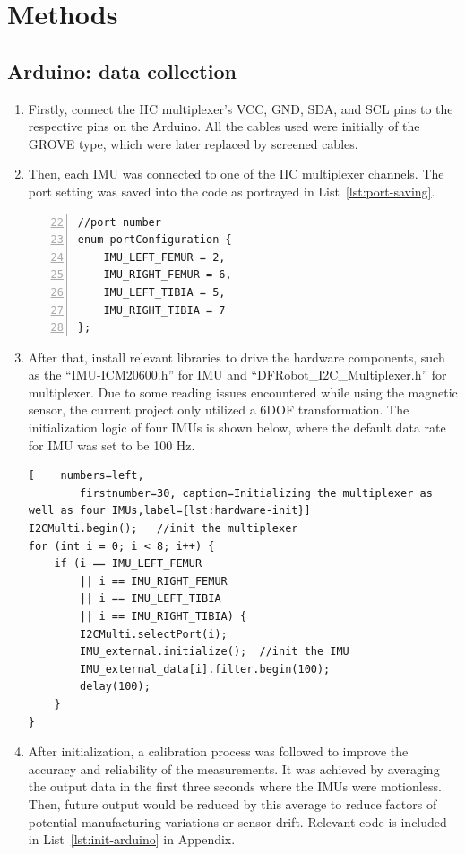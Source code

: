 \section{Methods}


\subsection{Arduino: data collection}\label{subsec:data-fetching}
\begin{enumerate}
	\item   Firstly, connect the IIC multiplexer's VCC, GND, SDA, and SCL pins to the respective pins on the Arduino.
	All the cables used were initially of the GROVE type, which were later replaced by screened cables.
	\item   Then, each IMU was connected to one of the IIC multiplexer channels.
	The port setting was saved into the code as portrayed in List~\ref{lst:port-saving}.

	\lstset{language=C++}
	\begin{lstlisting}[caption=Saving the port setting of four IMUs.,    numbers=left,
		firstnumber=22, label={lst:port-saving}]
//port number
enum portConfiguration {
    IMU_LEFT_FEMUR = 2,
    IMU_RIGHT_FEMUR = 6,
    IMU_LEFT_TIBIA = 5,
    IMU_RIGHT_TIBIA = 7
};
	\end{lstlisting}

	\item   After that, install relevant libraries to drive the hardware components, such as the ``IMU-ICM20600.h'' for IMU and ``DFRobot\_I2C\_Multiplexer.h'' for multiplexer.
	Due to some reading issues encountered while using the magnetic sensor, the current project only utilized a 6DOF transformation.
	The initialization logic of four IMUs is shown below, where the default data rate for IMU was set to be 100 Hz.

	\lstset{language=C++}
	\begin{lstlisting}[    numbers=left,
		firstnumber=30, caption=Initializing the multiplexer as well as four IMUs,label={lst:hardware-init}]
I2CMulti.begin();   //init the multiplexer
for (int i = 0; i < 8; i++) {
    if (i == IMU_LEFT_FEMUR
        || i == IMU_RIGHT_FEMUR
        || i == IMU_LEFT_TIBIA
        || i == IMU_RIGHT_TIBIA) {
        I2CMulti.selectPort(i);
        IMU_external.initialize();  //init the IMU
        IMU_external_data[i].filter.begin(100);
        delay(100);
    }
}
	\end{lstlisting}

	\item   After initialization, a calibration process was followed to improve the accuracy and reliability of the measurements.
	It was achieved by averaging the output data in the first three seconds where the IMUs were motionless.
	Then, future output would be reduced by this average to reduce factors of potential manufacturing variations or sensor drift.
	Relevant code is included in List~\ref{lst:init-arduino} in Appendix.


\end{enumerate}
